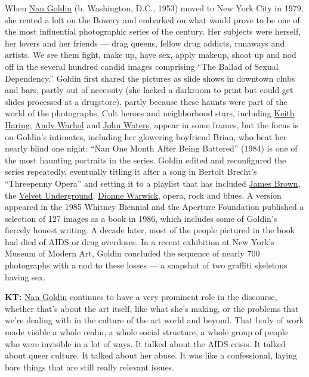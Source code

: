 When
\href{https://www.nytimes.com/2018/06/11/t-magazine/a-heroin-chic-photographers-new-project-tackling-the-opioid-epidemic.html}{Nan
Goldin} (b. Washington, D.C., 1953) moved to New York City in 1979, she
rented a loft on the Bowery and embarked on what would prove to be one
of the most influential photographic series of the century. Her subjects
were herself, her lovers and her friends --- drag queens, fellow drug
addicts, runaways and artists. We see them fight, make up, have sex,
apply makeup, shoot up and nod off in the several hundred candid images
comprising ``The Ballad of Sexual Dependency.'' Goldin first shared the
pictures as slide shows in downtown clubs and bars, partly out of
necessity (she lacked a darkroom to print but could get slides processed
at a drugstore), partly because these haunts were part of the world of
the photographs. Cult heroes and neighborhood stars, including
\href{https://www.nytimes.com/topic/person/keith-haring}{Keith Haring},
\href{https://www.nytimes.com/2018/05/02/t-magazine/andy-warhol-photo-portraits.html}{Andy
Warhol} and \href{https://www.nytimes.com/topic/person/john-waters}{John
Waters}, appear in some frames, but the focus is on Goldin's intimates,
including her glowering boyfriend Brian, who beat her nearly blind one
night: ``Nan One Month After Being Battered'' (1984) is one of the most
haunting portraits in the series. Goldin edited and reconfigured the
series repeatedly, eventually titling it after a song in Bertolt
Brecht's ``Threepenny Opera'' and setting it to a playlist that has
included \href{https://www.nytimes.com/topic/person/james-brown}{James
Brown}, the
\href{https://www.nytimes.com/topic/organization/the-velvet-underground}{Velvet
Underground},
\href{https://www.nytimes.com/2010/09/21/nyregion/21computer.html}{Dionne
Warwick}, opera, rock and blues. A version appeared in the 1985 Whitney
Biennial and the Aperture Foundation published a selection of 127 images
as a book in 1986, which includes some of Goldin's fiercely honest
writing. A decade later, most of the people pictured in the book had
died of AIDS or drug overdoses. In a recent exhibition at New York's
Museum of Modern Art, Goldin concluded the sequence of nearly 700
photographs with a nod to these losses --- a snapshot of two graffiti
skeletons having sex.

\textbf{KT:}
\href{https://www.nytimes.com/2018/01/22/arts/design/nan-goldin-oxycontin-addiction-opioid.html}{Nan
Goldin} continues to have a very prominent role in the discourse,
whether that's about the art itself, like what she's making, or the
problems that we're dealing with in the culture of the art world and
beyond. That body of work made visible a whole realm, a whole social
structure, a whole group of people who were invisible in a lot of ways.
It talked about the AIDS crisis. It talked about queer culture. It
talked about her abuse. It was like a confessional, laying bare things
that are still really relevant issues.

